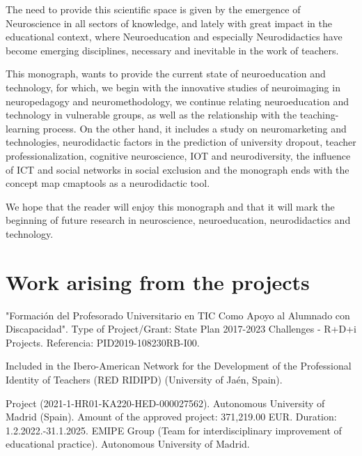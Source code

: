 \documentclass[portuguese]{textolivre}
\begin{document}
The need to provide this scientific space is given by the emergence of Neuroscience in all sectors of knowledge, and lately with great impact in the educational context, where Neuroeducation and especially Neurodidactics have become emerging disciplines, necessary and inevitable in the work of teachers.

This monograph, wants to provide the current state of neuroeducation and technology, for which, we begin with the innovative studies of neuroimaging in neuropedagogy and neuromethodology, we continue relating neuroeducation and technology in vulnerable groups, as well as the relationship with the teaching-learning process. On the other hand, it includes a study on neuromarketing and technologies, neurodidactic factors in the prediction of university dropout, teacher professionalization, cognitive neuroscience, IOT and neurodiversity, the influence of ICT and social networks in social exclusion and the monograph ends with the concept map cmaptools as a neurodidactic tool. 

We hope that the reader will enjoy this monograph and that it will mark the beginning of future research in neuroscience, neuroeducation, neurodidactics and technology.

\section{Work arising from the projects}

"Formación del Profesorado Universitario en TIC Como Apoyo al Alumnado con Discapacidad". Type of Project/Grant: State Plan 2017-2023 Challenges - R+D+i Projects. Referencia: PID2019-108230RB-I00. 

Included in the Ibero-American Network for the Development of the Professional Identity of Teachers (RED RIDIPD) (University of Jaén, Spain).

Project (2021-1-HR01-KA220-HED-000027562). Autonomous University of Madrid (Spain). Amount of the approved project: 371,219.00 EUR. Duration: 1.2.2022.-31.1.2025. EMIPE Group (Team for interdisciplinary improvement of educational practice). Autonomous University of Madrid.


\printbibliography\label{sec-bib}
\end{document}
